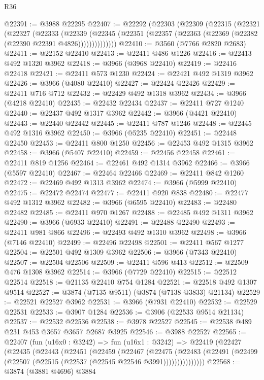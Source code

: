 \begin{lexlean}{R36}
\begin{coremodule}
@22391 := @3988 @22295
@22407 := @22292
    (@22303
      (@22309
        (@22315
          (@22321
            (@22327
              (@22333
                (@22339
                  (@22345 (@22351 (@22357 (@22363 (@22369 (@22382 (@22390 @22391 @4826))))))))))))))
@22410 := @3560 (@7766 @2820 @2683)
@22411 := @22152 @22410
@22413 := @22411 @486 @1226
@22416 := @22413 @492 @1320 @3962
@22418 := @3966 (@3968 @22410)
@22419 := @22416 @22418
@22421 := @22411 @573 @1230
@22424 := @22421 @492 @1319 @3962
@22426 := @3966 (@4080 @22410)
@22427 := @22424 @22426
@22429 := @22411 @716 @712
@22432 := @22429 @492 @1318 @3962
@22434 := @3966 (@4218 @22410)
@22435 := @22432 @22434
@22437 := @22411 @727 @1240
@22440 := @22437 @492 @1317 @3962
@22442 := @3966 (@4421 @22410)
@22443 := @22440 @22442
@22445 := @22411 @787 @1246
@22448 := @22445 @492 @1316 @3962
@22450 := @3966 (@5235 @22410)
@22451 := @22448 @22450
@22453 := @22411 @800 @1250
@22456 := @22453 @492 @1315 @3962
@22458 := @3966 (@5407 @22410)
@22459 := @22456 @22458
@22461 := @22411 @819 @1256
@22464 := @22461 @492 @1314 @3962
@22466 := @3966 (@5597 @22410)
@22467 := @22464 @22466
@22469 := @22411 @842 @1260
@22472 := @22469 @492 @1313 @3962
@22474 := @3966 (@5999 @22410)
@22475 := @22472 @22474
@22477 := @22411 @920 @838
@22480 := @22477 @492 @1312 @3962
@22482 := @3966 (@6595 @22410)
@22483 := @22480 @22482
@22485 := @22411 @970 @1267
@22488 := @22485 @492 @1311 @3962
@22490 := @3966 (@6933 @22410)
@22491 := @22488 @22490
@22493 := @22411 @981 @866
@22496 := @22493 @492 @1310 @3962
@22498 := @3966 (@7146 @22410)
@22499 := @22496 @22498
@22501 := @22411 @567 @1277
@22504 := @22501 @492 @1309 @3962
@22506 := @3966 (@7343 @22410)
@22507 := @22504 @22506
@22509 := @22411 @596 @413
@22512 := @22509 @476 @1308 @3962
@22514 := @3966 (@7729 @22410)
@22515 := @22512 @22514
@22518 := @21135 @22410 @754 @1284
@22521 := @22518 @492 @1307 @9514
@22527 := @3874 (@7135 @9511) (@3874 (@7138 @3833) @21134)
@22529 := @22521 @22527 @3962
@22531 := @3966 (@7931 @22410)
@22532 := @22529 @22531
@22533 := @3907 @1284
@22536 := @3906 (@22533 @9514 @21134)
@22537 := @22532 @22536
@22538 := @3978 @22527
@22545 := @22538 @489 @231 @453 @3657 @3657 @2687 @3925
@22546 := @3988 @22527
@22565 := @22407
    (fun (u16x0 : @3242) =>
    fun (u16x1 : @3242) =>
    @22419
      (@22427
        (@22435
          (@22443
            (@22451
              (@22459
                (@22467
                  (@22475
                    (@22483
                      (@22491 (@22499 (@22507 (@22515 (@22537 (@22545 @22546 @3991)))))))))))))))
@22568 := @3874 (@3881 @4696) @3884

\end{coremodule}
\end{lexlean}
